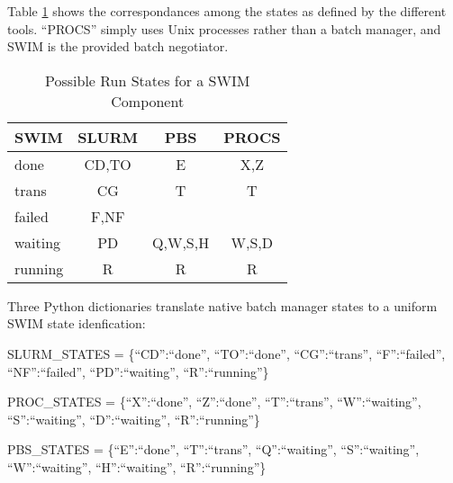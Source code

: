 Table \ref{states} shows the correspondances among the states as defined by
the different tools.  ``PROCS'' simply uses Unix processes rather than a batch
manager, and SWIM is the provided batch negotiator.
  \begin{table}
    \begin{center}
      \begin{tabular}{||l|c|c|c||} \hline \hline
        {\bf SWIM}      &  {\bf SLURM}      & {\bf PBS}  & {\bf PROCS} \\ \hline \hline
		done            &  CD,TO          &  E          &  X,Z            \\  \hline
		trans           &  CG              &  T          &  T            \\ \hline
		failed          &  F,NF            &             &               \\ \hline
		waiting         &  PD              &  Q,W,S,H    &  W,S,D        \\ \hline
		running         &  R               &  R          &  R            \\ \hline \hline
      \end{tabular}
    \end{center}
    \caption{\label{states} Possible Run States for a SWIM Component}
  \end{table}
  
Three Python dictionaries translate native batch manager states
to a uniform SWIM state idenfication:
  \begin{itemizer}
  \item  SLURM\_STATES = \{``CD'':``done'', ``TO'':``done'', ``CG'':``trans'', ``F'':``failed'',
    ``NF'':``failed'', ``PD'':``waiting'', ``R'':``running''\}
  \item PROC\_STATES = \{``X'':``done'', ``Z'':``done'', ``T'':``trans'', ``W'':``waiting'',
    ``S'':``waiting'', ``D'':``waiting'', ``R'':``running''\}
  \item PBS\_STATES = \{``E'':``done'', ``T'':``trans'', ``Q'':``waiting'', ``S'':``waiting'',
    ``W'':``waiting'', ``H'':``waiting'', ``R'':``running''\}
  \end{itemizer}  


